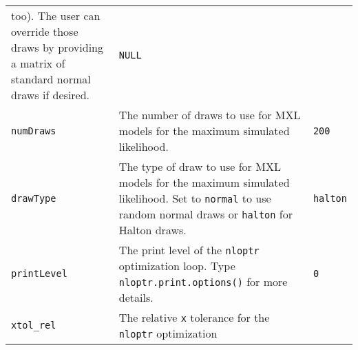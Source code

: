 \documentclass[article]{jss}
\begin{document}
\begin{longtable}[]{@{}lll@{}}
\begin{minipage}[t]{0.61\columnwidth}
too). The user can override those draws by providing a matrix of
standard normal draws if desired.\strut
\end{minipage} & \begin{minipage}[t]{0.12\columnwidth}\raggedright
\texttt{NULL}\strut
\end{minipage}\tabularnewline
\begin{minipage}[t]{0.18\columnwidth}\raggedright
\texttt{numDraws}\strut
\end{minipage} & \begin{minipage}[t]{0.61\columnwidth}\raggedright
The number of draws to use for MXL models for the maximum simulated
likelihood.\strut
\end{minipage} & \begin{minipage}[t]{0.12\columnwidth}\raggedright
\texttt{200}\strut
\end{minipage}\tabularnewline
\begin{minipage}[t]{0.18\columnwidth}\raggedright
\texttt{drawType}\strut
\end{minipage} & \begin{minipage}[t]{0.61\columnwidth}\raggedright
The type of draw to use for MXL models for the maximum simulated
likelihood. Set to \texttt{\textquotesingle{}normal\textquotesingle{}}
to use random normal draws or
\texttt{\textquotesingle{}halton\textquotesingle{}} for Halton
draws.\strut
\end{minipage} & \begin{minipage}[t]{0.12\columnwidth}\raggedright
\texttt{\textquotesingle{}halton\textquotesingle{}}\strut
\end{minipage}\tabularnewline
\begin{minipage}[t]{0.18\columnwidth}\raggedright
\texttt{printLevel}\strut
\end{minipage} & \begin{minipage}[t]{0.61\columnwidth}\raggedright
The print level of the \texttt{nloptr} optimization loop. Type
\texttt{nloptr.print.options()} for more details.\strut
\end{minipage} & \begin{minipage}[t]{0.12\columnwidth}\raggedright
\texttt{0}\strut
\end{minipage}\tabularnewline
\begin{minipage}[t]{0.18\columnwidth}\raggedright
\texttt{xtol\_rel}\strut
\end{minipage} & \begin{minipage}[t]{0.61\columnwidth}\raggedright
The relative \texttt{x} tolerance for the \texttt{nloptr} optimization

\end{minipage}
\end{longtable}
\end{document}
